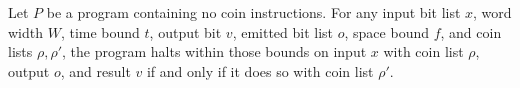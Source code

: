 \begin{theorem}
\label{WordRAM.HaltsWithin.coin_irrel}
\leanok
{}
Let $P$ be a program containing no coin instructions. For any input bit list $x$, word
width $W$, time bound $t$, output bit $v$, emitted bit list $o$, space bound $f$, and
coin lists $\rho,\rho'$, the program halts within those bounds on input $x$ with coin
list $\rho$, output $o$, and result $v$ if and only if it does so with coin list
$\rho'$.
\end{theorem}
